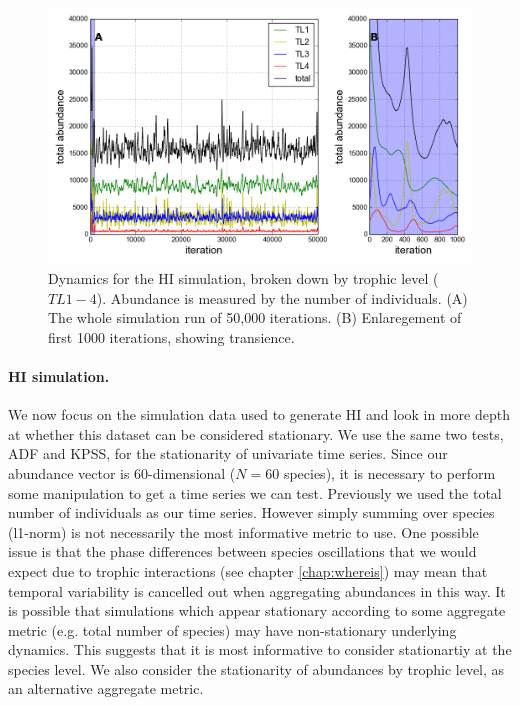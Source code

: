 
\begin{figure}[h!]
	\centering
	\includegraphics[width=0.7\linewidth]{"./chapters/chapter04b/figures/hi_trophic_dynamics"}
     \caption{Dynamics for the HI simulation, broken down by trophic level ($TL1-4$). Abundance is measured by the number of individuals. (A) The whole simulation run of 50,000 iterations. (B) Enlaregement of first 1000 iterations, showing transience.} 
     \label{fig:hi_trophic_dynamics}   
\end{figure}


\paragraph*{HI simulation.}
We now focus on the simulation data used to generate HI and look in more depth at whether this dataset can be considered stationary. We use the same two tests, ADF and KPSS, for the stationarity of univariate time series. Since our abundance vector is 60-dimensional ($N=60$ species), it is necessary to perform some manipulation to get a time series we can test. Previously we used the total number of individuals as our time series. However simply summing over species (l1-norm) is not necessarily the most informative metric to use. One possible issue is that the phase differences between species oscillations that we would expect due to trophic interactions (see chapter \ref{chap:whereis}) may mean that temporal variability is cancelled out when aggregating abundances in this way. It is possible that simulations which appear stationary according to some aggregate metric (e.g. total number of species) may have non-stationary underlying dynamics. This suggests that it is most informative to consider stationartiy at the species level. We also consider the stationarity of abundances by trophic level, as an alternative aggregate metric.

